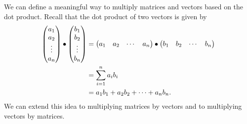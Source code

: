 \documentclass{ximera}
\begin{document}

We can define a meaningful way to multiply matrices and vectors based
on the dot product. Recall that the dot product of two vectors is
given by
\begin{align*}
  \begin{pmatrix}
    a_1\\
    a_2\\
    \vdots\\
    a_n
  \end{pmatrix}
  \bullet
  \begin{pmatrix}
    b_1\\
    b_2\\
    \vdots\\
    b_n
  \end{pmatrix}
  &=\begin{pmatrix} a_1 & a_2 & \cdots & a_n\end{pmatrix}\bullet\begin{pmatrix} b_1 & b_2 & \cdots & b_n\end{pmatrix}\\
  &= \sum_{i=1}^n a_ib_i\\
  & = a_1b_1 + a_2b_2 +\dots+a_nb_n.
\end{align*}
We can extend this idea to multiplying matrices by vectors and to
multiplying vectors by matrices.
\end{document}
